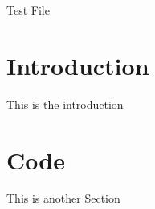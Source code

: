 \documentclass{article}
\begin{document}
	Test File
	
	\section{Introduction}
	
	This is the introduction
	
	\section{Code}
	
	This is another Section
	
\end{document}
